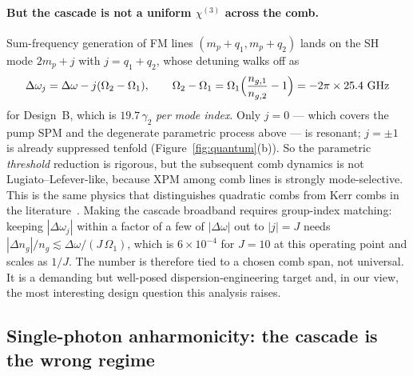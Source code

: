\documentclass[11pt,a4paper]{article}
\newcommand{\chithree}{\chi^{(3)}}
\newcommand{\Dom}{\Delta\omega}
\begin{document}
\paragraph{But the cascade is not a uniform $\chithree$ across the comb.}
Sum-frequency generation of FM lines $(m_p+q_1,m_p+q_2)$ lands on the SH
mode $2m_p+j$ with $j=q_1+q_2$, whose detuning walks off as
\begin{equation}
  \Dom_j=\Dom-j(\Omega_2-\Omega_1),
  \qquad
  \Omega_2-\Omega_1=\Omega_1\Bigl(\frac{n_{g,1}}{n_{g,2}}-1\Bigr)
  =-2\pi\times25.4\ \mathrm{GHz}
\end{equation}
for Design~B, which is $19.7\,\gamma_2$ \emph{per mode index}.  Only
$j=0$ --- which covers the pump SPM and the degenerate parametric
process above --- is resonant; $j=\pm1$ is already suppressed tenfold
(Figure~\ref{fig:quantum}(b)).  So the parametric \emph{threshold}
reduction is rigorous, but the subsequent comb dynamics is not
Lugiato--Lefever-like, because XPM among comb lines is strongly
mode-selective.  This is the same physics that distinguishes quadratic
combs from Kerr combs in the literature~\cite{QuadraticComb2024}.
Making the cascade broadband requires group-index matching: keeping
$|\Dom_j|$ within a factor of a few of $|\Dom|$ out to $|j|=J$ needs
$|\Delta n_g|/n_g\lesssim\Dom/(J\,\Omega_1)$, which is
$6\times10^{-4}$ for $J=10$ at this operating point and scales as $1/J$.
The number is therefore tied to a chosen comb span, not universal.  It
is a demanding but well-posed dispersion-engineering target and, in our
view, the most interesting design question this analysis raises.

\subsection{Single-photon anharmonicity: the cascade is the wrong regime}
\end{document}
